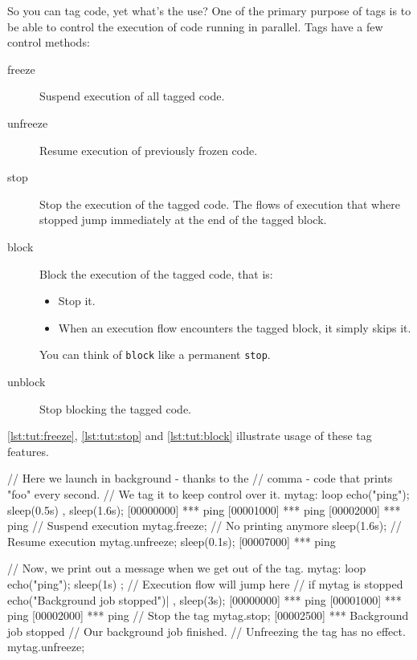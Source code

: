 So you can tag code, yet what's the use? One of the primary purpose of
tags is to be able to control the execution of code running in
parallel. Tags have a few control methods:

\begin{description}
\item[freeze] Suspend execution of all tagged code.
\item[unfreeze] Resume execution of previously frozen code.
\item[stop] Stop the execution of the tagged code. The flows of
  execution that where stopped jump immediately at the end of the
  tagged block.
\item[block] Block the execution of the tagged code, that is:
  \begin{itemize}
  \item Stop it.
  \item When an execution flow encounters the tagged block, it simply
    skips it.
  \end{itemize}
  You can think of \lstinline{block} like a permanent \lstinline{stop}.
\item[unblock] Stop blocking the tagged code.
\end{description}

\autoref{lst:tut:freeze}, \autoref{lst:tut:stop} and
\autoref{lst:tut:block} illustrate usage of these tag features.

\begin{urbiscript}[caption=Freezing/unfreezing code execution, label=lst:tut:freeze]
// Here we launch in background - thanks to the
// comma - code that prints "foo" every second.
// We tag it to keep control over it.
mytag:
{
  loop
  {
    echo("ping");
    sleep(0.5s)
  }
},
sleep(1.6s);
[00000000] *** ping
[00001000] *** ping
[00002000] *** ping
// Suspend execution
mytag.freeze;
// No printing anymore
sleep(1.6s);
// Resume execution
mytag.unfreeze;
sleep(0.1s);
[00007000] *** ping
\end{urbiscript}

\begin{urbiscript}[caption=Stopping code execution, label=lst:tut:stop]
// Now, we print out a message when we get out of the tag.
{
  mytag:
  {
    loop
    {
      echo("ping"); sleep(1s)
    }
  };
  // Execution flow will jump here
  // if mytag is stopped
  echo("Background job stopped")|
},
sleep(3s);
[00000000] *** ping
[00001000] *** ping
[00002000] *** ping
// Stop the tag
mytag.stop;
[00002500] *** Background job stopped
// Our background job finished.
// Unfreezing the tag has no effect.
mytag.unfreeze;
\end{urbiscript}

